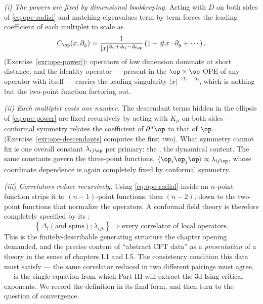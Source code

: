 \emph{(i) The powers are fixed by dimensional bookkeeping.} Acting with $D$ on
both sides of \eqref{eq:ope-radial} and matching eigenvalues term by term
forces the leading coefficient of each multiplet to scale as
\begin{equation}
C_\op(x, \partial_y) = \frac{1}{|x|^{\Delta_i + \Delta_j - \Delta_\op}}
\left( 1 + \# x\cdot\partial_y + \cdots \right),
\label{eq:ope-power}
\end{equation}
(Exercise~\ref{exr:ope-power}): operators of low dimension dominate at short
distance, and the identity operator --- present in the $\op\times\op$ OPE of
any operator with itself --- carries the leading singularity
$|x|^{-\Delta_i-\Delta_j}$, which is nothing but the two-point function
factoring out.

\emph{(ii) Each multiplet costs one number.} The descendant terms hidden in
the ellipsis of \eqref{eq:ope-power} are fixed recursively by acting with
$K_\mu$ on both sides --- conformal symmetry relates the coefficient of
$\partial^n \op$ to that of $\op$ (Exercise~\ref{exr:ope-descendants} computes
the first two). What symmetry cannot fix is one overall constant
$\lambda_{ij\op}$ per primary: the , the
dynamical content. The same constants govern the three-point functions,
$\langle \op_i \op_j \op \rangle \propto \lambda_{ij\op}$, whose
coordinate dependence is again completely fixed by conformal symmetry.

\emph{(iii) Correlators reduce recursively.} Using \eqref{eq:ope-radial}
inside an $n$-point function strips it to $(n-1)$-point functions, then
$(n-2)$, down to the two-point functions that normalize the operators. A
conformal field theory is therefore completely specified by its
:
\begin{equation}
\left\{ \Delta_i (\text{and spins}) ; \lambda_{ijk} \right\}
\Longrightarrow \text{every correlator of local operators}.
\label{eq:cft-data}
\end{equation}
This is the finitely-describable generating structure the chapter opening
demanded, and the precise content of ``abstract CFT data'' as a
\emph{presentation} of a theory in the sense of chapters I.1 and I.5. The
consistency condition this data must satisfy --- the same correlator reduced
in two different pairings must agree,  --- is the
single equation from which Part III will extract the 3d Ising critical
exponents. We record the definition in its final form, and then turn to the
question of convergence.

